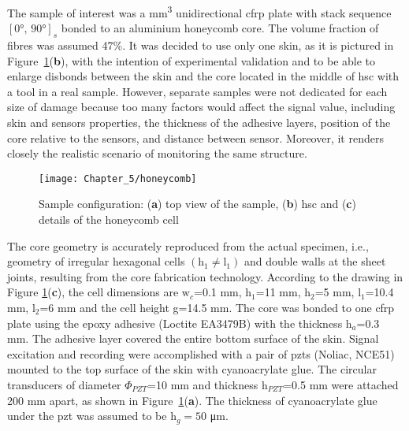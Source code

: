 \documentclass[11pt,a4paper,final]{report}
\theoremstyle{plain}
\begin{document}
The sample of interest was a  \unit{\cubic\mm} unidirectional \ac{cfrp} plate with stack sequence \(\left[\ang{0},\,\ang{90}\right]_s\) bonded to an aluminium honeycomb core.
The volume fraction of fibres was assumed 47\%.
It was decided to use only one skin, as it is pictured in Figure~\ref{fig:honeycomb}(\textbf{b}), with the intention of experimental validation and to be able to enlarge disbonds between the skin and the core located in the middle of \ac{hsc} with a tool in a real sample. 
However, separate samples were not dedicated for each size of damage because too many factors would affect the signal value, including skin and sensors properties, the thickness of the adhesive layers, position of the core relative to the sensors, and distance between sensor.
Moreover, it renders closely the realistic scenario of monitoring the same structure.
\begin{figure}[H]
	\begin{center}
		\texttt{[image: Chapter\_5/honeycomb]}
	\end{center}
	\caption{Sample configuration: (\textbf{a}) top view of the sample, (\textbf{b}) \acl{hsc} and (\textbf{c}) details of the honeycomb cell}
	\label{fig:honeycomb}
\end{figure}

The core geometry is accurately reproduced from the actual specimen, i.e., geometry of irregular hexagonal cells \(\left(\mathrm{h}_1 \ne \mathrm{l}_1\right)\) and double walls at the sheet joints, resulting from the core fabrication technology.
According to the drawing in Figure \ref{fig:honeycomb}(\textbf{c}), the cell dimensions are \(\mathrm{w}_c\)=0.1 \unit{\mm}, h\(_1\)=11 \unit{\mm}, h\(_2\)=5 \unit{\mm}, l\(_1\)=10.4 \unit{\mm}, l\(_2\)=6 \unit{\mm} and the cell height g=14.5 \unit{\mm}.
The core was bonded to one \ac{cfrp} plate using the epoxy adhesive (Loctite EA3479B) with the thickness h\(_a\)=0.3 \unit{\mm}.
The adhesive layer covered the entire bottom surface of the skin.
Signal excitation and recording were accomplished with a pair of \acp{pzt}  (Noliac, NCE51) mounted to the top surface of the skin with cyanoacrylate glue.
The circular transducers of diameter \(\Phi_{PZT}\)=10 \unit{\mm} and thickness h\(_{PZT}\)=0.5 \unit{\mm} were attached 200 \unit{\mm} apart, as shown in Figure~\ref{fig:honeycomb}(\textbf{a}).
The thickness of cyanoacrylate glue under the \ac{pzt} was assumed to be h\(_g=50\) \unit{\micro\m}.
\end{document}
